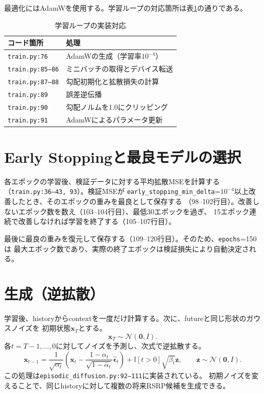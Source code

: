 \documentclass[a4paper,11pt]{bxjsarticle}
\begin{document}
最適化にはAdamWを使用する。学習ループの対応箇所は表\ref{tab:training}の通りである。
\begin{table}[htbp]
\centering
\caption{学習ループの実装対応}
\label{tab:training}
\begin{tabular}{ll}
\toprule
コード箇所 & 処理 \\
\midrule
\texttt{train.py:76} & AdamWの生成（学習率$10^{-4}$） \\
\texttt{train.py:85--86} & ミニバッチの取得とデバイス転送 \\
\texttt{train.py:87--88} & 勾配初期化と拡散損失の計算 \\
\texttt{train.py:89} & 誤差逆伝播 \\
\texttt{train.py:90} & 勾配ノルムを1.0にクリッピング \\
\texttt{train.py:91} & AdamWによるパラメータ更新 \\
\bottomrule
\end{tabular}
\end{table}

\section{Early Stoppingと最良モデルの選択}
各エポックの学習後、検証データに対する平均拡散MSEを計算する
（\texttt{train.py:36--43, 93}）。検証MSEが
\texttt{early\_stopping\_min\_delta}=$10^{-4}$以上改善したとき、そのエポックの重みを最良として保存する
（98--102行目）。改善しないエポック数を数え（103--104行目）、最低30エポックを過ぎ、
15エポック連続で改善しなければ学習を終了する（105--107行目）。

最後に最良の重みを復元して保存する（109--120行目）。そのため、\texttt{epochs}=150は
最大エポック数であり、実際の終了エポックは検証損失により自動決定される。

\section{生成（逆拡散）}
学習後、historyからcontextを一度だけ計算する。次に、futureと同じ形状のガウスノイズを
初期状態$\mathbf{x}_T$とする。
\begin{equation}
  \mathbf{x}_T\sim\mathcal{N}(\mathbf{0},I).
\end{equation}
各$t=T-1,\ldots,0$に対してノイズを予測し、次式で逆拡散する。
\begin{equation}
  \mathbf{x}_{t-1}=
  \frac{1}{\sqrt{\alpha_t}}
  \left(
    \mathbf{x}_{t}-
    \frac{1-\alpha_t}{\sqrt{1-\bar{\alpha}_t}}
    \hat{\boldsymbol{\epsilon}}_t
  \right)
  + \mathbb{I}[t>0]\sqrt{\beta_t}\mathbf{z},
  \qquad \mathbf{z}\sim\mathcal{N}(\mathbf{0},I).
\end{equation}
この処理は\texttt{episodic\_diffusion.py:92--111}に実装されている。
初期ノイズを変えることで、同じhistoryに対して複数の将来RSRP候補を生成できる。
\end{document}
